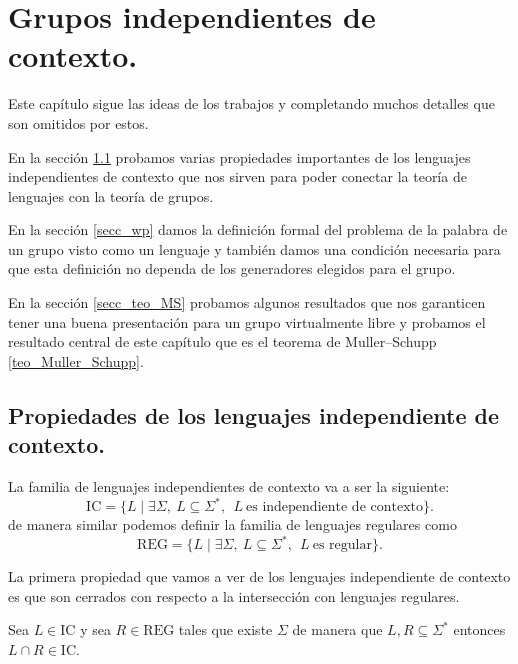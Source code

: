 \documentclass[tesis.tex]{subfiles}
\begin{document}
\chapter{Grupos independientes de contexto.}
Este capítulo sigue las ideas de los trabajos \cite{muller1983groups} y \cite{muller1985theory} completando muchos detalles que son omitidos por estos.

En la sección \ref{secc_grp_ic} probamos varias propiedades importantes de los lenguajes independientes de contexto que nos sirven para poder conectar la teoría de lenguajes con la teoría de grupos.

En la sección \ref{secc_wp} damos la definición formal del problema de la palabra de un grupo visto como un lenguaje y también damos una condición necesaria para que esta definición no dependa de los generadores elegidos para el grupo.


En la sección \ref{secc_teo_MS} probamos algunos resultados que nos garanticen tener una buena presentación para un grupo virtualmente libre y probamos el resultado central de este capítulo que es el teorema de Muller--Schupp \ref{teo_Muller_Schupp}.


\section{Propiedades de los lenguajes independiente de contexto.}\label{secc_grp_ic}

La familia de lenguajes independientes de contexto va a ser la siguiente:
\[
	\text{IC} = \{  L \mid \exists \Sigma, \ L \subseteq \Sigma^*, \ \ L \  \text{es independiente de contexto} \}.
\]
de manera similar podemos definir la familia de lenguajes regulares como
\[
	\text{REG} = \{  L \mid \exists \Sigma, \ L \subseteq \Sigma^*, \ \ L \  \text{es regular}  \}.
\]

La primera propiedad que vamos a ver de los lenguajes independiente de contexto es que son cerrados con respecto a la intersección con lenguajes regulares.

\begin{prop}\label{intersecciones-reg-ic}
	Sea $L \in \text{IC}$ y sea $R \in \text{REG}$ tales que existe $\Sigma$ de manera que $L,R \subseteq \Sigma^{*}$ entonces $L \cap R \in \text{IC}$.	
\end{prop}
\end{document}
